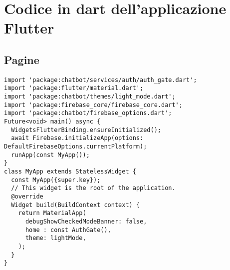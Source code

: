\section{Codice in dart dell'applicazione Flutter}
\subsection{Pagine}
\begin{lstlisting}[style=pythonstyle,caption={Codice di main.dart}, label={lst:main}]
import 'package:chatbot/services/auth/auth_gate.dart';
import 'package:flutter/material.dart';
import 'package:chatbot/themes/light_mode.dart';
import 'package:firebase_core/firebase_core.dart';
import 'package:chatbot/firebase_options.dart';
Future<void> main() async {
  WidgetsFlutterBinding.ensureInitialized();
  await Firebase.initializeApp(options: DefaultFirebaseOptions.currentPlatform);
  runApp(const MyApp());
}
class MyApp extends StatelessWidget {
  const MyApp({super.key});
  // This widget is the root of the application.
  @override
  Widget build(BuildContext context) {
    return MaterialApp(
      debugShowCheckedModeBanner: false,
      home : const AuthGate(),
      theme: lightMode,
    );
  }
}
\end{lstlisting}
